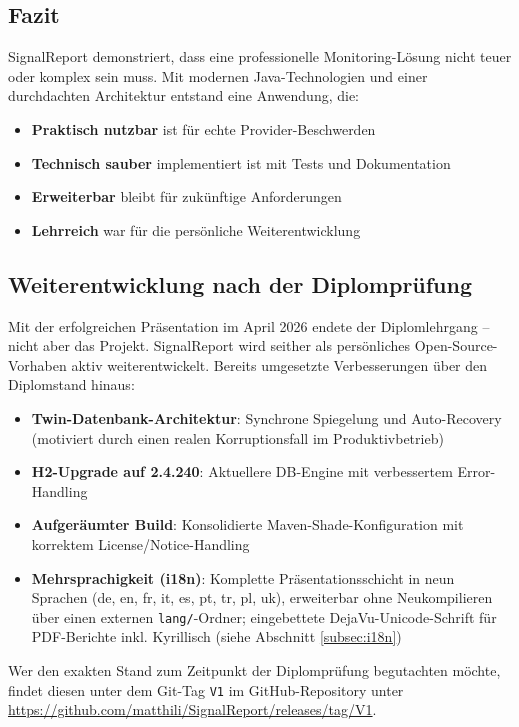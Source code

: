 \subsection{Fazit}
SignalReport demonstriert, dass eine professionelle Monitoring-Lösung nicht teuer oder komplex sein muss. Mit modernen Java-Technologien und einer durchdachten Architektur entstand eine Anwendung, die:

\begin{itemize}
    \item \textbf{Praktisch nutzbar} ist für echte Provider-Beschwerden
    \item \textbf{Technisch sauber} implementiert ist mit Tests und Dokumentation
    \item \textbf{Erweiterbar} bleibt für zukünftige Anforderungen
    \item \textbf{Lehrreich} war für die persönliche Weiterentwicklung
\end{itemize}

\subsection{Weiterentwicklung nach der Diplomprüfung}
Mit der erfolgreichen Präsentation im April 2026 endete der Diplomlehrgang -- nicht aber das Projekt. SignalReport wird seither als persönliches Open-Source-Vorhaben aktiv weiterentwickelt. Bereits umgesetzte Verbesserungen über den Diplomstand hinaus:

\begin{itemize}
    \item \textbf{Twin-Datenbank-Architektur}: Synchrone Spiegelung und Auto-Recovery (motiviert durch einen realen Korruptionsfall im Produktivbetrieb)
    \item \textbf{H2-Upgrade auf 2.4.240}: Aktuellere DB-Engine mit verbessertem Error-Handling
    \item \textbf{Aufgeräumter Build}: Konsolidierte Maven-Shade-Konfiguration mit korrektem License/Notice-Handling
    \item \textbf{Mehrsprachigkeit (i18n)}: Komplette Präsentationsschicht in neun Sprachen (de, en, fr, it, es, pt, tr, pl, uk), erweiterbar ohne Neukompilieren über einen externen \texttt{lang/}-Ordner; eingebettete DejaVu-Unicode-Schrift für PDF-Berichte inkl. Kyrillisch (siehe Abschnitt \ref{subsec:i18n})
\end{itemize}

Wer den exakten Stand zum Zeitpunkt der Diplomprüfung begutachten möchte, findet diesen unter dem Git-Tag \texttt{V1} im GitHub-Repository unter \href{https://github.com/matthili/SignalReport/releases/tag/V1}{https://github.com/matthili/SignalReport/releases/tag/V1}.

